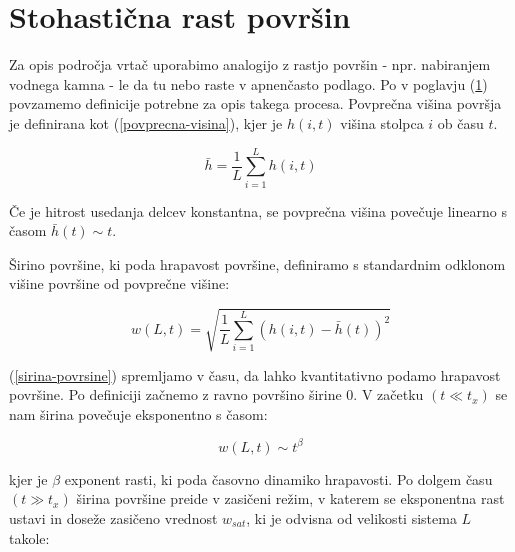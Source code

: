 \documentclass[a4paper, oneside, 12pt]{book}
\begin{document}

        \section{Stohastična rast površin}
        \label{definicije}

        Za opis področja vrtač uporabimo analogijo z rastjo površin - npr. nabiranjem vodnega kamna - le da tu nebo raste v apnenčasto podlago.
        Po \cite{barabasi1995fractal} v poglavju (\ref{definicije}) povzamemo definicije potrebne za opis takega procesa.
        Povprečna višina površja je definirana kot (\ref{povprecna-visina}), kjer je $h(i,t)$ višina stolpca $i$ ob času $t$.

        \begin{equation}
          \bar{h} = \frac{1}{L} \sum_{i=1}^L h(i,t)
          \label{povprecna-visina}
        \end{equation}

        Če je hitrost usedanja delcev konstantna, se povprečna višina povečuje linearno s časom $\bar{h}(t) \sim t$.

        Širino površine, ki poda hrapavost površine, definiramo s standardnim odklonom višine površine od povprečne višine:

        \begin{equation}
          w(L,t) = \sqrt{\frac{1}{L} \sum_{i=1}^L (h(i,t)-\bar{h}(t))^2}
          \label{sirina-povrsine}
        \end{equation}

        (\ref{sirina-povrsine}) spremljamo v času, da lahko kvantitativno podamo hrapavost površine. Po definiciji začnemo z ravno površino širine 0. V začetku $(t \ll t_x)$ se nam širina povečuje eksponentno s časom:

        \begin{equation}
          w(L,t) \sim t^\beta
          \label{beta}
        \end{equation}

        kjer je $\beta$ exponent rasti, ki poda časovno dinamiko hrapavosti.
        Po dolgem času $(t \gg t_x)$ širina površine preide v zasičeni režim, v katerem se eksponentna rast ustavi in doseže zasičeno vrednost $w_{sat}$, ki je odvisna od velikosti sistema $L$ takole:
\end{document}
